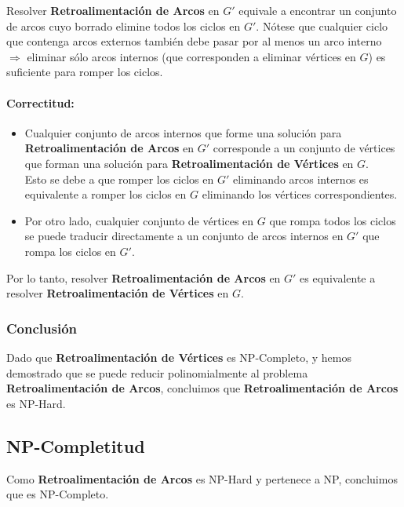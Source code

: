 \documentclass[a4paper,12pt]{article}
\begin{document}
Resolver \textbf{Retroalimentaci\'on de Arcos} en $G'$ equivale a encontrar un conjunto de arcos cuyo borrado elimine todos los ciclos en $G'$. 
Nótese que cualquier ciclo que contenga arcos externos tambi\'en debe pasar por al menos un arco interno $\Rightarrow$ eliminar s\'olo arcos internos (que corresponden a eliminar v\'ertices en $G$) es suficiente para romper los ciclos.

\paragraph{Correctitud:}
\begin{itemize}
    \item Cualquier conjunto de arcos internos que forme una soluci\'on para \textbf{Retroalimentaci\'on de Arcos} en $G'$ corresponde a un conjunto de v\'ertices que forman una soluci\'on para \textbf{Retroalimentaci\'on de V\'ertices} en $G$.\\
    Esto se debe a que romper los ciclos en $G'$ eliminando arcos internos es equivalente a romper los ciclos en $G$ eliminando los v\'ertices correspondientes.
    \item Por otro lado, cualquier conjunto de v\'ertices en $G$ que rompa todos los ciclos se puede traducir directamente a un conjunto de arcos internos en $G'$ que rompa los ciclos en $G'$.
\end{itemize}

Por lo tanto, resolver \textbf{Retroalimentaci\'on de Arcos} en $G'$ es equivalente a resolver \textbf{Retroalimentaci\'on de V\'ertices} en $G$.

\subsubsection{Conclusi\'on}
Dado que \textbf{Retroalimentaci\'on de V\'ertices} es NP-Completo, y hemos demostrado que se puede reducir polinomialmente al problema \textbf{Retroalimentaci\'on de Arcos}, concluimos que \textbf{Retroalimentaci\'on de Arcos} es NP-Hard.

\subsection{NP-Completitud}

Como \textbf{Retroalimentaci\'on de Arcos} es NP-Hard y pertenece a NP, concluimos que es NP-Completo.
\end{document}
